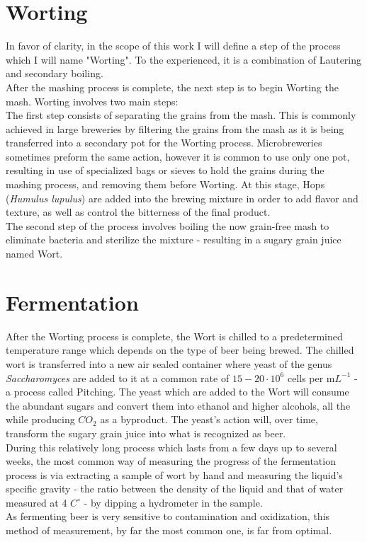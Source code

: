 \documentclass[twoside]{ctuthesis}
\theoremstyle{plain}
\theoremstyle{definition}
\theoremstyle{note}
\begin{document}
\section{Worting}
In favor of clarity, in the scope of this work I will define a step of the process which I will name "Worting". To the experienced, it is a combination of Lautering and secondary boiling.\\
After the mashing process is complete, the next step is to begin Worting the mash. Worting involves two main steps:\\
The first step consists of separating the grains from the mash. This is commonly achieved in large breweries by filtering the grains from the mash as it is being transferred into a secondary pot for the Worting process. Microbreweries sometimes preform the same action, however it is common to use only one pot, resulting in use of specialized bags or sieves to hold the grains during the mashing process, and removing them before Worting. At this stage, Hops (\textit{Humulus lupulus}) are added into the brewing mixture in order to add flavor and texture, as well as control the bitterness of the final product.\cite{Hops}\\
The second step of the process involves boiling the now grain-free mash to eliminate bacteria and sterilize the mixture - resulting in a sugary grain juice named Wort.

\pagebreak

\section{Fermentation}
After the Worting process is complete, the Wort is chilled to a predetermined temperature range which depends on the type of beer being brewed. The chilled wort is transferred into a new air sealed container where yeast of the genus \textit{Saccharomyces} are added to it at a common rate of $15-20 \cdot 10^6$ cells per m$L^{-1}$ - a process called Pitching. The yeast which are added to the Wort will consume the abundant sugars and convert them into ethanol and higher alcohols, all the while producing $CO_2$ as a byproduct. The yeast's action will, over time, transform the sugary grain juice into what is recognized as beer.\\
During this relatively long process which lasts from a few days up to several weeks, the most common way of measuring the progress of the fermentation process is via extracting a sample of wort by hand and measuring the liquid's specific gravity - the ratio between the density of the liquid and that of water measured at 4 $C^\circ$ - by dipping a hydrometer in the sample.\\
As fermenting beer is very sensitive to contamination and oxidization, this method of measurement, by far the most common one, is far from optimal. \cite{Biochemistry}
\end{document}
